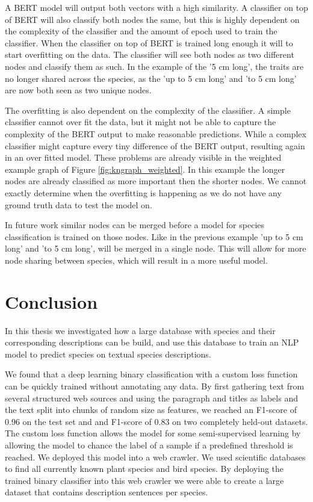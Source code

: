 \documentclass[a4paper, 12pt, oneside]{book} %
\begin{document}
A BERT model will output both vectors with a high similarity.
A classifier on top of BERT will also classify both nodes the same, but this is highly dependent on the complexity of the classifier and the amount of epoch used to train the classifier.
When the classifier on top of BERT is trained long enough it will to start overfitting on the data.
The classifier will see both nodes as two different nodes and classify them as such.
In the example of the '5 cm long', the traits are no longer shared across the species, as the 'up to 5 cm long' and 'to 5 cm long' are now both seen as two unique nodes.


The overfitting is also dependent on the complexity of the classifier. 
A simple classifier cannot over fit the data, but it might not be able to capture the complexity of the BERT output to make reasonable predictions.
While a complex classifier might capture every tiny difference of the BERT output, resulting again in an over fitted model.
These problems are already visible in the weighted example graph of Figure \ref{fig:kngraph_weighted}.
In this example the longer nodes are already classified as more important then the shorter nodes.
We cannot exactly determine when the overfitting is happening as we do not have any ground truth data to test the model on.

In future work similar nodes can be merged before a model for species classification is trained on those nodes.
Like in the previous example 'up to 5 cm long' and 'to 5 cm long', will be merged in a single node.
This will allow for more node sharing between species, which will result in a more useful model.

\newpage
\section{Conclusion} \label{par:conclusion}
In this thesis we investigated how a large database with species and their corresponding descriptions can be build, and use this database to train an NLP model to predict species on textual species descriptions.

We found that a deep learning binary classification with a custom loss function can be quickly trained without annotating any data.
By first gathering text from several structured web sources and using the paragraph and titles as labels and the text split into chunks of random size as features, we reached an F1-score of 0.96 on the test set and and F1-score of 0.83 on two completely held-out datasets.
The custom loss function allows the model for some semi-supervised learning by allowing the model to chance the label of a sample if a predefined threshold is reached.
We deployed this model into a web crawler.
We used scientific databases to find all currently known plant species and bird species.
By deploying the trained binary classifier into this web crawler we were able to create a large dataset that contains description sentences per species.
\end{document}
